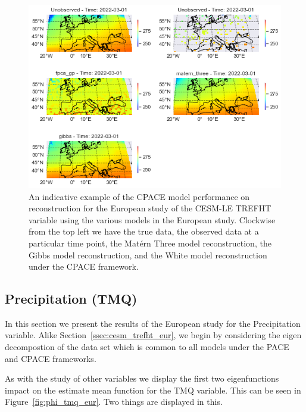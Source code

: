 \begin{figure}
	\centering
	\includegraphics[width=\textwidth]{full_ex_trefht_eur}
	\caption[An indicative example of the CPACE model performance on reconstruction for the European study of the CESM-LE TREFHT variable using the various models in the European study.]{An indicative example of the CPACE model performance on reconstruction for the European study of the CESM-LE TREFHT variable using the various models in the European study. Clockwise from the top left we have the true data, the observed data at a particular time point, the Mat\'ern Three model reconstruction, the Gibbs model reconstruction, and the White model reconstruction under the CPACE framework.}
	\label{fig:full_ex_trefht_eur}
\end{figure}

\subsection{Precipitation (TMQ)\label{ssec:cesm_tmq_eur}}
In this section we present the results of the European study for the Precipitation variable. 
Alike Section~\ref{ssec:cesm_trefht_eur}, we begin by considering the eigen decompostion of the data set which is common to all models under the PACE and CPACE frameworks.

As with the study of other variables we display the first two eigenfunctions impact on the estimate mean function for the TMQ variable.
This can be seen in Figure~\ref{fig:phi_tmq_eur}.
Two things are displayed in this.

